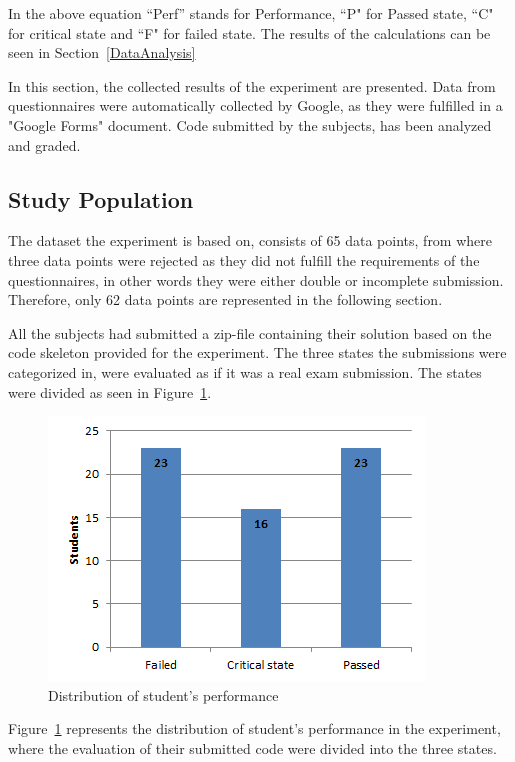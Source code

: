 \documentclass{sig-alternate-05-2015}
\begin{document}
In the above equation ``Perf'' stands for Performance, ``P" for Passed state, ``C" for critical state and ``F" for failed state. 
The results of the calculations can be seen in Section~\ref{DataAnalysis}

\label{sec:Results}
In this section, the collected results of the experiment are presented. Data from questionnaires were automatically collected by Google, as they were fulfilled in a "Google Forms" document. Code submitted by the subjects, has been analyzed and graded.

\subsection{Study Population}
\label{DemograpichInformation}
The dataset the experiment is based on, consists of 65 data points, from where three data points were rejected as they did not fulfill the requirements of the questionnaires, in other words they were either double or incomplete submission. Therefore, only 62 data points are represented in the following section.

All the subjects had submitted a zip-file containing their solution based on the code skeleton provided for the experiment. The three states the submissions were categorized in, were evaluated as if it was a real exam submission.
The states were divided as seen in Figure~\ref{fig:DistributionOfStudentPerformance}.

\begin{figure}[!ht]
	\centering
	\includegraphics[width=1\linewidth]{img01}
	\caption{Distribution of student's performance}
	\label{fig:DistributionOfStudentPerformance}
\end{figure}
Figure~\ref{fig:DistributionOfStudentPerformance} represents the distribution of student's performance in the experiment, where the evaluation of their submitted code were divided into the three states.\\
\end{document}
